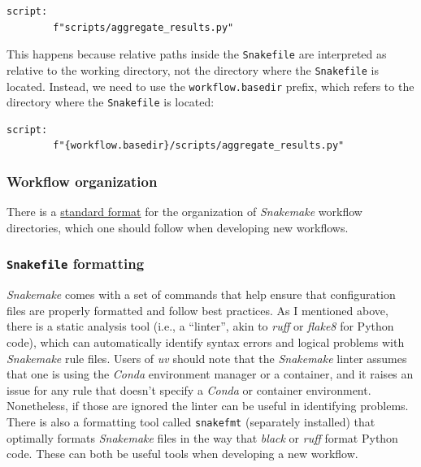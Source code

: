 \begin{lstlisting}[style=Pythonshort]
script:
        f"scripts/aggregate_results.py"
\end{lstlisting}

This happens because relative paths inside the \texttt{Snakefile} are interpreted as relative to the working directory, not the directory where the \texttt{Snakefile} is located.  Instead, we need to use the \texttt{workflow.basedir} prefix, which refers to the directory where the \texttt{Snakefile} is located:

\begin{lstlisting}[style=Pythonshort]
script:
        f"{workflow.basedir}/scripts/aggregate_results.py"
\end{lstlisting}

\subsubsection{Workflow organization}

There is a \href{https://snakemake.readthedocs.io/en/stable/snakefiles/deployment.html\#distribution-and-reproducibility}{standard format} for the organization of \textit{Snakemake} workflow directories, which one should follow when developing new workflows.

\subsubsection{\texttt{Snakefile} formatting}

\textit{Snakemake} comes with a set of commands that help ensure that configuration files are properly formatted and follow best practices.  As I mentioned above, there is a static analysis tool (i.e., a ``linter'', akin to \textit{ruff} or \textit{flake8} for Python code), which can automatically identify syntax errors and logical problems with \textit{Snakemake} rule files.  Users of \textit{uv} should note that the \textit{Snakemake} linter assumes that one is using the \textit{Conda} environment manager or a container, and it raises an issue for any rule that doesn't specify a \textit{Conda} or container environment. Nonetheless, if those are ignored the linter can be useful in identifying problems. There is also a formatting tool called \texttt{snakefmt} (separately installed) that optimally formats \textit{Snakemake} files in the way that \textit{black} or \textit{ruff} format Python code.  These can both be useful tools when developing a new workflow.

